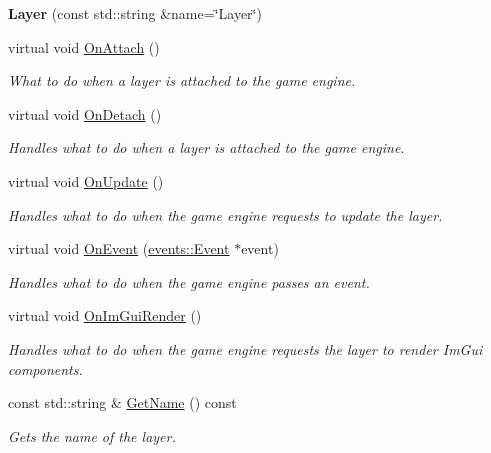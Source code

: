 \begin{DoxyCompactItemize}
\item 
\mbox{\label{classengine_1_1Layer_a7c94872b9fc69fd1695e21319c6ae495}} 
{\bfseries Layer} (const std\+::string \&name=\char`\"{}Layer\char`\"{})
\item 
virtual void \hyperlink{classengine_1_1Layer_ace68c1d4e441165d6741a74d4b11c7f0}{On\+Attach} ()
\begin{DoxyCompactList}\small\item\em What to do when a layer is attached to the game engine. \end{DoxyCompactList}\item 
virtual void \hyperlink{classengine_1_1Layer_acfa7e624cfd2cb85803382511454d098}{On\+Detach} ()
\begin{DoxyCompactList}\small\item\em Handles what to do when a layer is attached to the game engine. \end{DoxyCompactList}\item 
virtual void \hyperlink{classengine_1_1Layer_a449eaba4fc30454d281419173bd6624b}{On\+Update} ()
\begin{DoxyCompactList}\small\item\em Handles what to do when the game engine requests to update the layer. \end{DoxyCompactList}\item 
virtual void \hyperlink{classengine_1_1Layer_a982be4dc6ab1d3d71162719138312872}{On\+Event} (\hyperlink{classengine_1_1events_1_1Event}{events\+::\+Event} $\ast$event)
\begin{DoxyCompactList}\small\item\em Handles what to do when the game engine passes an event. \end{DoxyCompactList}\item 
virtual void \hyperlink{classengine_1_1Layer_a002df9fddaba135a8bd7abc14e3fb067}{On\+Im\+Gui\+Render} ()
\begin{DoxyCompactList}\small\item\em Handles what to do when the game engine requests the layer to render Im\+Gui components. \end{DoxyCompactList}\item 
const std\+::string \& \hyperlink{classengine_1_1Layer_a770a8fb58326ed32779e84bf54a93eef}{Get\+Name} () const
\begin{DoxyCompactList}\small\item\em Gets the name of the layer. \end{DoxyCompactList}\end{DoxyCompactItemize}
